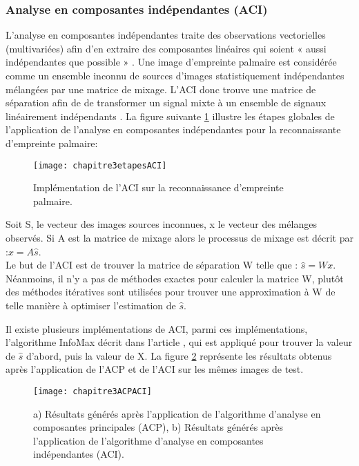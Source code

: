\subsubsection{Analyse en composantes indépendantes (ACI)}
\label{ACI}
L'analyse en composantes indépendantes traite des observations vectorielles (multivariées) afin d’en extraire des composantes linéaires qui soient « aussi indépendantes que possible » \citep{cardoso2002analyse}.
Une image d’empreinte palmaire est considérée comme un ensemble inconnu de sources d’images statistiquement indépendantes mélangées par une matrice de mixage.
L’ACI donc trouve une matrice de séparation afin de de transformer un signal mixte à un ensemble de signaux linéairement indépendants \citep{connie2003palmprint}.
La figure suivante \ref{fig:chapitre3etapesACI} illustre les étapes globales de l’application de l’analyse en composantes indépendantes pour la reconnaissante d’empreinte palmaire:
\begin{center}
	\begin{figure}[H]
		\centering
		\texttt{[image: chapitre3etapesACI]}
		\caption{Implémentation de l’ACI sur la reconnaissance d’empreinte palmaire.}
		\label{fig:chapitre3etapesACI}
	\end{figure}
\end{center}
Soit S, le vecteur des images sources inconnues, x le vecteur des mélanges observés.
Si A est la matrice de mixage alors le processus de mixage est décrit par :$x=A\hat{s}$.
\\
Le but de l'ACI est de trouver la matrice de séparation W telle que :
$\hat{s}=Wx$.
\\

Néanmoins, il n’y a pas de méthodes exactes pour calculer la matrice W, plutôt des méthodes itératives sont utilisées pour trouver une approximation à W de telle manière à optimiser l’estimation de $\hat{s}$.

Il existe plusieurs implémentations de ACI, parmi ces implémentations, l’algorithme InfoMax décrit dans l’article \citep{bartlett2002face}, qui est appliqué pour trouver la valeur de $\hat{s}$ d’abord, puis la valeur de X.
La figure \ref{fig:chapitre3ACPACI} représente les résultats obtenus après l’application de l’ACP et de l’ACI sur les mêmes images de test.
\begin{center}
	\begin{figure}[H]
		\centering
		\texttt{[image: chapitre3ACPACI]}
		\caption{a) Résultats générés après l’application de l’algorithme d’analyse en composantes principales (ACP), b) Résultats générés après l’application de l’algorithme d’analyse en composantes indépendantes (ACI).}
		\label{fig:chapitre3ACPACI}
	\end{figure}
\end{center}

